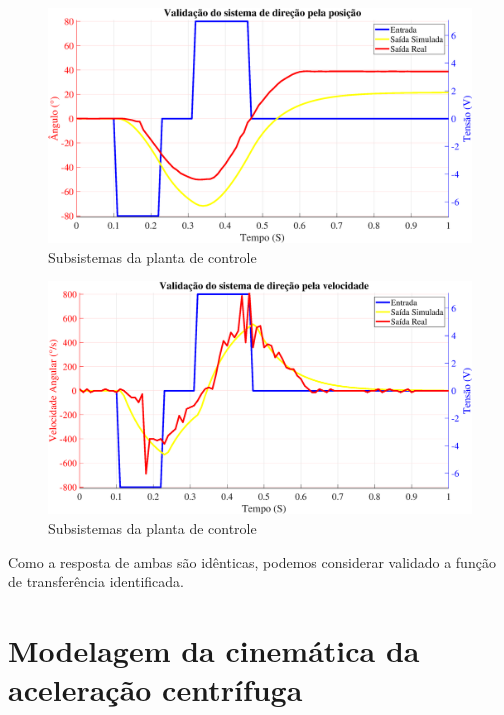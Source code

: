 	        \begin{figure}[h]
                \centering
                \includegraphics[width=15cm]{Imagens/cap4/sis_direcao/valid_direcao.eps}
                \caption{Subsistemas da planta de controle}
                \label{subsistemas}
            \end{figure}
            
            \begin{figure}[h]
                \centering
                \includegraphics[width=15cm]{Imagens/cap4/sis_direcao/valid_direcao2.eps}
                \caption{Subsistemas da planta de controle}
                \label{subsistemas}
            \end{figure}
	        
	        Como a resposta de ambas são idênticas, podemos considerar validado a função de transferência identificada.
	    
	    
	\section{Modelagem da cinemática da aceleração centrífuga}\label{sec:modelagemaceleracao}

